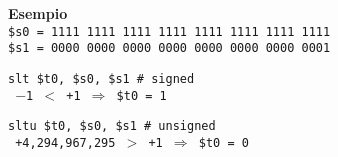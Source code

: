 \documentclass[../main.tex]{subfiles}
\begin{document}
\vspace*{5mm}

\noindent
\textbf{Esempio} \\
\texttt{\$s0 = 1111 1111 1111 1111 1111 1111 1111 1111} \\
\texttt{\$s1 = 0000 0000 0000 0000 0000 0000 0000 0001}
\begin{table}[h!]
    \begin{minipage}{.5\linewidth}
        \texttt{slt \$t0, \$s0, \$s1 \# signed} \\
        \texttt{\hspace*{0cm} \hspace*{0cm} $-$1 $<$ +1 $\Rightarrow$ \$t0 = 1} \\
    \end{minipage}
    \begin{minipage}{.5\linewidth}
        \texttt{sltu \$t0, \$s0, \$s1 \# unsigned} \\
\texttt{\hspace*{0cm} \hspace*{0cm} +4,294,967,295 $>$ +1 $\Rightarrow$ \$t0 = 0} \\
    \end{minipage}
\end{table}
\end{document}
